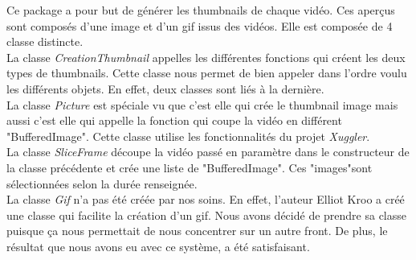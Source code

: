 Ce package a pour but de générer les thumbnails de chaque vidéo. Ces aperçus sont composés d'une image et d'un gif issus des vidéos. Elle est composée de 4 classe distincte.\\
La classe \textit{CreationThumbnail} appelles les différentes fonctions qui créent les deux types de thumbnails. Cette classe nous permet de bien appeler dans l'ordre voulu les différents objets. En effet, deux classes sont liés à la dernière.\\
La classe \textit{Picture} est spéciale vu que c'est elle qui crée le thumbnail image mais aussi c'est elle qui appelle la fonction qui coupe la vidéo en différent "BufferedImage". Cette classe utilise les fonctionnalités du projet \textit{Xuggler}.\\
La classe \textit{SliceFrame} découpe la vidéo passé en paramètre dans le constructeur de la classe précédente et crée une liste de "BufferedImage". Ces "images"sont sélectionnées selon la durée renseignée.\\
La classe \textit{Gif} n'a pas été créée par nos soins. En effet, l'auteur Elliot Kroo a créé une classe qui facilite la création d'un gif. Nous avons décidé de prendre sa classe puisque ça nous permettait de nous concentrer sur un autre front. De plus, le résultat que nous avons eu avec ce système, a été satisfaisant.